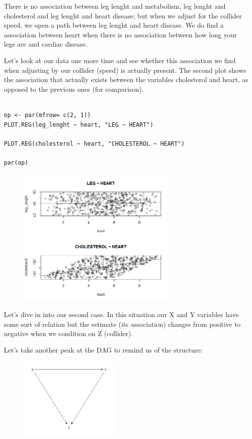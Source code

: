 \documentclass{article}
\begin{document}
There is no association between leg lenght and metabolism, leg lenght and  cholesterol and leg lenght and heart disease; but when we adjust for the  collider speed, we open a path between leg lenght and heart disease. We  do find  a association between heart when there is no association between  how long your legs are and cardiac disease.

Let's look at our data one more time and see whether this association we find when adjusting by our collider (speed) is actually present. The second plot shows the association that actually exists between the variables cholesterol and heart, as opposed to the previous ones (for comparison).


\begin{lstlisting}

op <- par(mfrow= c(2, 1))
PLOT.REG(leg_lenght ~ heart, "LEG ~ HEART")

PLOT.REG(cholesterol ~ heart, "CHOLESTEROL ~ HEART")

par(op)
\end{lstlisting}

\begin{figure}[h]
\includegraphics[width=8cm]{COMP_LEG_CHOL_HEART.png}
\centering
\end{figure}



Let's dive in into our second case. In this situation our X and Y variables have some sort of relation but the estimate (its association) changes from positive to negative when we condition on Z (collider).

Let's take another peak at the DAG to remind us of the structure:

\begin{figure}[h]
\includegraphics[width=5cm]{DAG_Situation2.png}
\centering
\end{figure}
\end{document}
